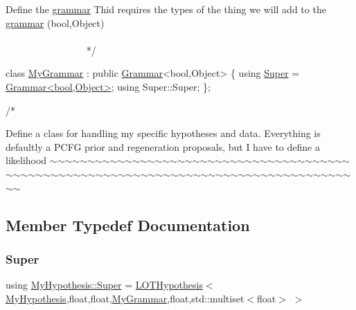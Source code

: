\begin{DoxyCode}
    Define the \hyperlink{class_l_o_t_hypothesis_affae32db28c39df676809ae47e14e7cf}{grammar}
    Thid requires the types of the thing we will add to the \hyperlink{class_l_o_t_hypothesis_affae32db28c39df676809ae47e14e7cf}{grammar} (\textcolor{keywordtype}{bool},Object)
   ~~~~~~~~~~~~~~~~~~~~~~~~~~~~~~~~~~~~~~~~~~~~~~~~~~~~~~~~~~~~~~~~~~~~~~~~~~~~~~~~~~~~~~~~ */



\textcolor{keyword}{class }\hyperlink{class_my_grammar}{MyGrammar} : \textcolor{keyword}{public} \hyperlink{class_grammar}{Grammar}<bool,Object> \{
    \textcolor{keyword}{using} \hyperlink{class_my_hypothesis_a266742f266abc638ddc1d1870d735313}{Super} =  \hyperlink{class_grammar}{Grammar<bool,Object>};
    \textcolor{keyword}{using} Super::Super;
\};


\textcolor{comment}{/*}
\end{DoxyCode}
 Define a class for handling my specific hypotheses and data. Everything is defaultly a P\+C\+FG prior and regeneration proposals, but I have to define a likelihood $\sim$$\sim$$\sim$$\sim$$\sim$$\sim$$\sim$$\sim$$\sim$$\sim$$\sim$$\sim$$\sim$$\sim$$\sim$$\sim$$\sim$$\sim$$\sim$$\sim$$\sim$$\sim$$\sim$$\sim$$\sim$$\sim$$\sim$$\sim$$\sim$$\sim$$\sim$$\sim$$\sim$$\sim$$\sim$$\sim$$\sim$$\sim$$\sim$$\sim$$\sim$$\sim$$\sim$$\sim$$\sim$$\sim$$\sim$$\sim$$\sim$$\sim$$\sim$$\sim$$\sim$$\sim$$\sim$$\sim$$\sim$$\sim$$\sim$$\sim$$\sim$$\sim$$\sim$$\sim$$\sim$$\sim$$\sim$$\sim$$\sim$$\sim$$\sim$$\sim$$\sim$$\sim$$\sim$$\sim$$\sim$$\sim$$\sim$$\sim$$\sim$$\sim$$\sim$$\sim$$\sim$$\sim$$\sim$$\sim$ 

\subsection{Member Typedef Documentation}
\mbox{\label{class_my_hypothesis_aebf7eaf0477f8b39639e917bc87d208f}} 
\subsubsection{\texorpdfstring{Super}{Super}\hspace{0.1cm}{\footnotesize\ttfamily [1/5]}}
{\footnotesize\ttfamily using \hyperlink{class_my_hypothesis_a266742f266abc638ddc1d1870d735313}{My\+Hypothesis\+::\+Super} =  \hyperlink{class_l_o_t_hypothesis}{L\+O\+T\+Hypothesis}$<$\hyperlink{class_my_hypothesis}{My\+Hypothesis},float,float,\hyperlink{class_my_grammar}{My\+Grammar},float,std\+::multiset$<$float$>$ $>$}

